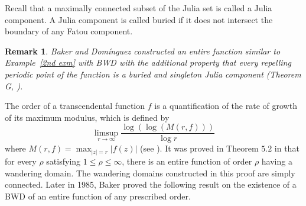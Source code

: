 \documentclass[11pt,a4paper]{article}
\newtheorem{Remark}{Remark}[section]
\begin{document}
	Recall that a maximally connected subset of the Julia set is called a Julia component.
	 A Julia component is called buried if it does not intersect the boundary of any Fatou component.
	\begin{Remark}
	 Baker and Dom\'inguez  constructed an entire function similar to Example~\ref{2nd exm} with BWD with the additional property that every repelling periodic point of the function is a buried and singleton Julia component (Theorem G, \cite{Baker Dominguez 2000}).  
	\end{Remark}
	The order of a transcendental function $f$ is a quantification of the rate of growth of its maximum modulus, which  is defined by 
	$$\label{For1}
	\limsup_{r\to\infty}\frac{\log(\log (M(r,f)))}{\log r} 
	$$
	where $M(r,f)=\max_{|z|=r}|f(z)|$  (see \cite{asymptoticvalue-book}). 
	It was proved in Theorem $5.2$ in \cite{Baker 1984} that for every $\rho$ satisfying $1\leq\rho\leq\infty$, there is an entire function of order $\rho$ having a wandering domain. The wandering domains constructed in this proof are simply connected. Later in 1985, Baker proved the following result on the existence of a BWD of an entire function of any prescribed order.
	
\end{document}
